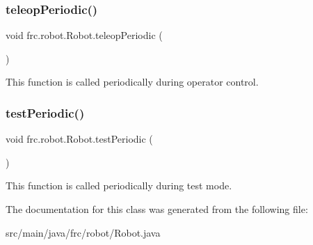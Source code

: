 \subsubsection{\texorpdfstring{teleopPeriodic()}{teleopPeriodic()}}
{\footnotesize\ttfamily void frc.\+robot.\+Robot.\+teleop\+Periodic (\begin{DoxyParamCaption}{ }\end{DoxyParamCaption})\hspace{0.3cm}{\ttfamily [inline]}}

This function is called periodically during operator control. \mbox{\label{classfrc_1_1robot_1_1_robot_abd152f34b9f33d5cdf835aa61331f33e}} 
\subsubsection{\texorpdfstring{testPeriodic()}{testPeriodic()}}
{\footnotesize\ttfamily void frc.\+robot.\+Robot.\+test\+Periodic (\begin{DoxyParamCaption}{ }\end{DoxyParamCaption})\hspace{0.3cm}{\ttfamily [inline]}}

This function is called periodically during test mode. 

The documentation for this class was generated from the following file\+:\begin{DoxyCompactItemize}
\item 
src/main/java/frc/robot/Robot.\+java\end{DoxyCompactItemize}
